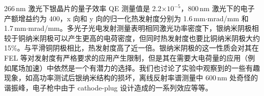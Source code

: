 266\,nm 激光下银晶片的量子效率 QE 测量值是 2.2$\times10^{-5}$，800\,nm 激光下的电子产额增益约为 400，x 向和 y 向的归一化热发射度分别为 1.6\,mm$\cdot$mrad/mm 和 1.7\,mm$\cdot$mrad/mm。多光子光电发射测量表明相同激光功率密度下，银纳米阴极相较于铜纳米阴极可以产生更高的电荷密度，但同时热发射度也要比铜纳米阴极大约 15\%。与平滑铜阴极相比，热发射度高了近一倍。银纳米阴极的这一性质会对其在 FEL 等对发射度有严格要求的应用产生限制，但是其在需要大电荷量的应用（例如尾场加速）中依然是一个有潜力的选择。我们也讨论了实验中观察到的一些有趣现象，如高功率测试后银纳米结构的损坏，离线反射率谱测量中 600\,nm 处奇怪的谐振峰，电子枪中由于 cathode-plug 设计造成的一系列效应等等。

